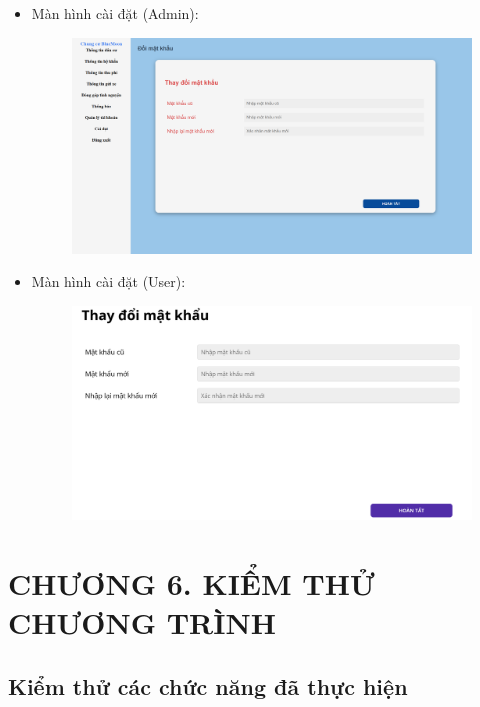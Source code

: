 \documentclass{article}
\begin{document}
\begin{itemize}
    \item Màn hình cài đặt (Admin):
    \begin{figure}[H]
        \centering
        \includegraphics[width=1\textwidth]{Ảnh chương 4/Cài đặt 1.png}
    \end{figure}
    \newpage
    \item Màn hình cài đặt (User):
    \begin{figure}[H]
        \centering
        \includegraphics[width=1\textwidth]{Ảnh chương 4/Cài đặt 2.png}
    \end{figure}
\end{itemize}
\newpage

\section*{CHƯƠNG 6. KIỂM THỬ CHƯƠNG TRÌNH}
\setcounter{section}{6}
\setcounter{subsection}{0}
\subsection{Kiểm thử các chức năng đã thực hiện}
\end{document}
